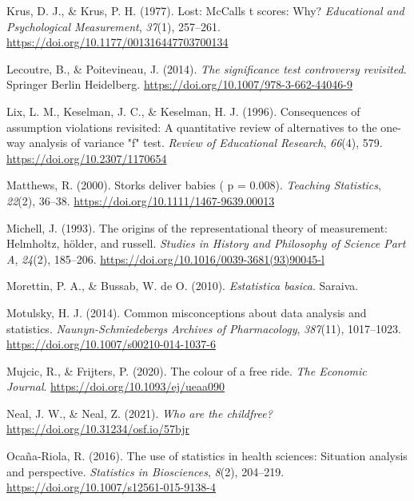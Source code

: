 \documentclass[
]{book}
\begin{document}
\leavevmode\hypertarget{ref-Krus1977}{}%
Krus, D. J., \& Krus, P. H. (1977). Lost: McCalls t scores: Why?
\emph{Educational and Psychological Measurement}, \emph{37}(1),
257--261. \url{https://doi.org/10.1177/001316447703700134}

\leavevmode\hypertarget{ref-Lecoutre2014}{}%
Lecoutre, B., \& Poitevineau, J. (2014). \emph{The significance test
controversy revisited}. Springer Berlin Heidelberg.
\url{https://doi.org/10.1007/978-3-662-44046-9}

\leavevmode\hypertarget{ref-Lix1996}{}%
Lix, L. M., Keselman, J. C., \& Keselman, H. J. (1996). Consequences of
assumption violations revisited: A quantitative review of alternatives
to the one-way analysis of variance "f" test. \emph{Review of
Educational Research}, \emph{66}(4), 579.
\url{https://doi.org/10.2307/1170654}

\leavevmode\hypertarget{ref-Matthews2000}{}%
Matthews, R. (2000). Storks deliver babies ( p = 0.008). \emph{Teaching
Statistics}, \emph{22}(2), 36--38.
\url{https://doi.org/10.1111/1467-9639.00013}

\leavevmode\hypertarget{ref-Michell1993}{}%
Michell, J. (1993). The origins of the representational theory of
measurement: Helmholtz, hölder, and russell. \emph{Studies in History
and Philosophy of Science Part A}, \emph{24}(2), 185--206.
\url{https://doi.org/10.1016/0039-3681(93)90045-l}

\leavevmode\hypertarget{ref-morettin_bussab_2010}{}%
Morettin, P. A., \& Bussab, W. de O. (2010). \emph{Estatistica basica}.
Saraiva.

\leavevmode\hypertarget{ref-Motulsky2014}{}%
Motulsky, H. J. (2014). Common misconceptions about data analysis and
statistics. \emph{Naunyn-Schmiedebergs Archives of Pharmacology},
\emph{387}(11), 1017--1023.
\url{https://doi.org/10.1007/s00210-014-1037-6}

\leavevmode\hypertarget{ref-Mujcic2020}{}%
Mujcic, R., \& Frijters, P. (2020). The colour of a free ride. \emph{The
Economic Journal}. \url{https://doi.org/10.1093/ej/ueaa090}

\leavevmode\hypertarget{ref-Neal2021}{}%
Neal, J. W., \& Neal, Z. (2021). \emph{Who are the childfree?}
\url{https://doi.org/10.31234/osf.io/57bjr}

\leavevmode\hypertarget{ref-OcaaRiola2016}{}%
Ocaña-Riola, R. (2016). The use of statistics in health sciences:
Situation analysis and perspective. \emph{Statistics in Biosciences},
\emph{8}(2), 204--219. \url{https://doi.org/10.1007/s12561-015-9138-4}
\end{document}
